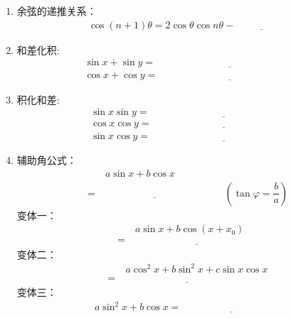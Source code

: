 \documentclass{article}
\newif\ifte
\begin{document}
\begin{multicols}{2}
\begin{enumerate}[leftmargin=20pt]
\item 余弦的递推关系：
\begin{gather*}
    \cos(n+1)\theta=2\cos\theta\cos n\theta-\underline{\ 
        \ifte \cos(n-1)\theta \else \hspace{2cm} \fi\ } 
\end{gather*}

\item 和差化积:
\begin{align*}
    \sin x+\sin y=&\ \underline{\ \ifte 2\sin \left(\dfrac{x+y}{2}
    \right) \cos\left(\dfrac{x-y}{2}\right)\else \hspace{5cm} \fi\ } \\ 
    \cos x+\cos y=&\ \underline{\ \ifte 2\cos \left(\dfrac{x+y}{2}\right) \cos  \left(\dfrac{x-y}{2}\right) \else \hspace{5cm} \fi\ }
\end{align*}

\item 积化和差:
\begin{align*}
    \sin x\sin y=&\ \underline{\ \ifte 
        \dfrac{1}{2}[\cos(x-y)-\cos(x+y)]
        \else \hspace{5cm} \fi\ } \\
    \cos x\cos y=&\ \underline{\ \ifte 
        \dfrac{1}{2}[\cos(x-y)+\cos(x+y)]
        \else \hspace{5cm} \fi\ } \\	
    \sin x\cos y=&\ \underline{\ \ifte 
        \dfrac{1}{2}[\sin(x+y)+\sin(x-y)] 
        \else \hspace{5cm} \fi\ }
\end{align*}

\item 辅助角公式：
\begin{align*}
     &\ a\sin x+b\cos x\\
    =&\ \underline{\ \ifte 
        \sqrt{a^2+b^2}\sin(x+\varphi)
        \else \hspace{4cm} \fi\ } \qquad
    \left(\tan \varphi=\dfrac{b}{a}\right)
\end{align*}
变体一：
\begin{align*}
     &\ a\sin x+b\cos (x+x_0) \\
    =&\ \underline{\ \ifte 
        a\sin x+b\cos x\cos x_0-b\sin x\sin x_0
        \else \hspace{5cm} \fi\ } 
\end{align*}
变体二：
\begin{align*}
     &\ a\cos^2x+b\sin^2x+c\sin x\cos x \\
    =&\ \underline{\ \ifte
    a\dfrac{\cos2x+1}{2} +b\dfrac{-\cos2x+1}{2}+
    \dfrac{c}{2}\sin2x  \else \hspace{5cm} \fi\ } 
\end{align*}
变体三：
\begin{align*}
    a\sin^2x+b\cos x=\underline{\ \ifte 
        a(1-\cos^2x)+b\cos x
        \else \hspace{4cm} \fi\ }
\end{align*}


\end{enumerate}
\end{multicols}
\end{document}
